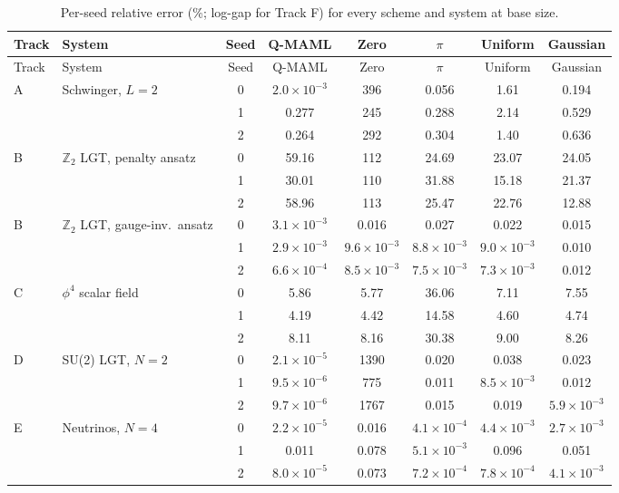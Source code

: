 \begin{longtable}{@{}llcccccc@{}}
\caption{Per-seed relative error (\%; log-gap for Track F) for every scheme and system at base size.}\label{tab:supp_tracks}\\
\toprule
Track & System & Seed & Q-MAML & Zero & $\pi$ & Uniform & Gaussian \\
\midrule
\endfirsthead
\toprule
Track & System & Seed & Q-MAML & Zero & $\pi$ & Uniform & Gaussian \\
\midrule
\endhead
A & Schwinger, $L{=}2$ & 0 & $2.0\!\times\!10^{-3}$ & 396 & 0.056 & 1.61 & 0.194 \\
 &  & 1 & 0.277 & 245 & 0.288 & 2.14 & 0.529 \\
 &  & 2 & 0.264 & 292 & 0.304 & 1.40 & 0.636 \\
B & $\mathbb{Z}_2$ LGT, penalty ansatz & 0 & 59.16 & 112 & 24.69 & 23.07 & 24.05 \\
 &  & 1 & 30.01 & 110 & 31.88 & 15.18 & 21.37 \\
 &  & 2 & 58.96 & 113 & 25.47 & 22.76 & 12.88 \\
B & $\mathbb{Z}_2$ LGT, gauge-inv.\ ansatz & 0 & $3.1\!\times\!10^{-3}$ & 0.016 & 0.027 & 0.022 & 0.015 \\
 &  & 1 & $2.9\!\times\!10^{-3}$ & $9.6\!\times\!10^{-3}$ & $8.8\!\times\!10^{-3}$ & $9.0\!\times\!10^{-3}$ & 0.010 \\
 &  & 2 & $6.6\!\times\!10^{-4}$ & $8.5\!\times\!10^{-3}$ & $7.5\!\times\!10^{-3}$ & $7.3\!\times\!10^{-3}$ & 0.012 \\
C & $\phi^4$ scalar field & 0 & 5.86 & 5.77 & 36.06 & 7.11 & 7.55 \\
 &  & 1 & 4.19 & 4.42 & 14.58 & 4.60 & 4.74 \\
 &  & 2 & 8.11 & 8.16 & 30.38 & 9.00 & 8.26 \\
D & SU(2) LGT, $N{=}2$ & 0 & $2.1\!\times\!10^{-5}$ & 1390 & 0.020 & 0.038 & 0.023 \\
 &  & 1 & $9.5\!\times\!10^{-6}$ & 775 & 0.011 & $8.5\!\times\!10^{-3}$ & 0.012 \\
 &  & 2 & $9.7\!\times\!10^{-6}$ & 1767 & 0.015 & 0.019 & $5.9\!\times\!10^{-3}$ \\
E & Neutrinos, $N{=}4$ & 0 & $2.2\!\times\!10^{-5}$ & 0.016 & $4.1\!\times\!10^{-4}$ & $4.4\!\times\!10^{-3}$ & $2.7\!\times\!10^{-3}$ \\
 &  & 1 & 0.011 & 0.078 & $5.1\!\times\!10^{-3}$ & 0.096 & 0.051 \\
 &  & 2 & $8.0\!\times\!10^{-5}$ & 0.073 & $7.2\!\times\!10^{-4}$ & $7.8\!\times\!10^{-4}$ & $4.1\!\times\!10^{-3}$ \\

\end{longtable}
